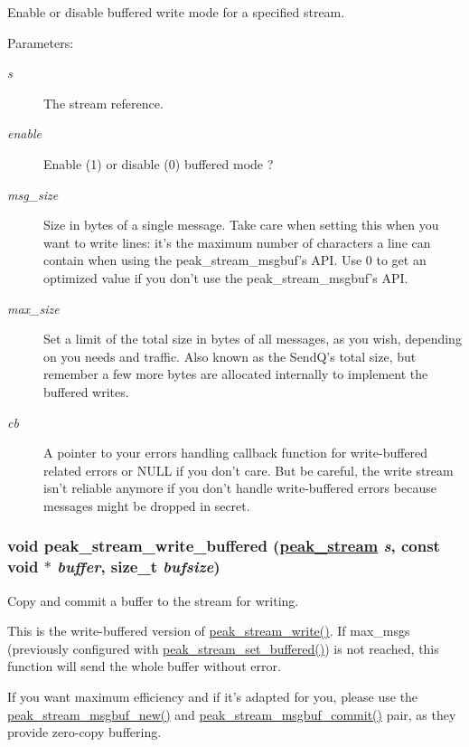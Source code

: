 Enable or disable buffered write mode for a specified stream. 

\begin{Desc}
\item[Parameters:]
\begin{description}
\item[{\em s}]The stream reference. \item[{\em enable}]Enable (1) or disable (0) buffered mode ? \item[{\em msg\_\-size}]Size in bytes of a single message. Take care when setting this when you want to write lines: it's the maximum number of characters a line can contain when using the peak\_\-stream\_\-msgbuf's API. Use 0 to get an optimized value if you don't use the peak\_\-stream\_\-msgbuf's API. \item[{\em max\_\-size}]Set a limit of the total size in bytes of all messages, as you wish, depending on you needs and traffic. Also known as the Send\-Q's total size, but remember a few more bytes are allocated internally to implement the buffered writes. \item[{\em cb}]A pointer to your errors handling callback function for write-buffered related errors or NULL if you don't care. But be careful, the write stream isn't reliable anymore if you don't handle write-buffered errors because messages might be dropped in secret. \end{description}
\end{Desc}
\hypertarget{group__stream__buf_ga3}{
\subsubsection[peak\_\-stream\_\-write\_\-buffered]{\setlength{\rightskip}{0pt plus 5cm}void peak\_\-stream\_\-write\_\-buffered (\hyperlink{group__stream_ga0}{peak\_\-stream} {\em s}, const void $\ast$ {\em buffer}, size\_\-t {\em bufsize})}}
\label{group__stream__buf_ga3}


Copy and commit a buffer to the stream for writing. 

This is the write-buffered version of \hyperlink{group__stream__low_ga46}{peak\_\-stream\_\-write()}. If max\_\-msgs (previously configured with \hyperlink{group__stream__buf_ga54}{peak\_\-stream\_\-set\_\-buffered()}) is not reached, this function will send the whole buffer without error.\par
 If you want maximum efficiency and if it's adapted for you, please use the \hyperlink{group__stream__buf_ga57}{peak\_\-stream\_\-msgbuf\_\-new()} and \hyperlink{group__stream__buf_ga58}{peak\_\-stream\_\-msgbuf\_\-commit()} pair, as they provide zero-copy buffering.

